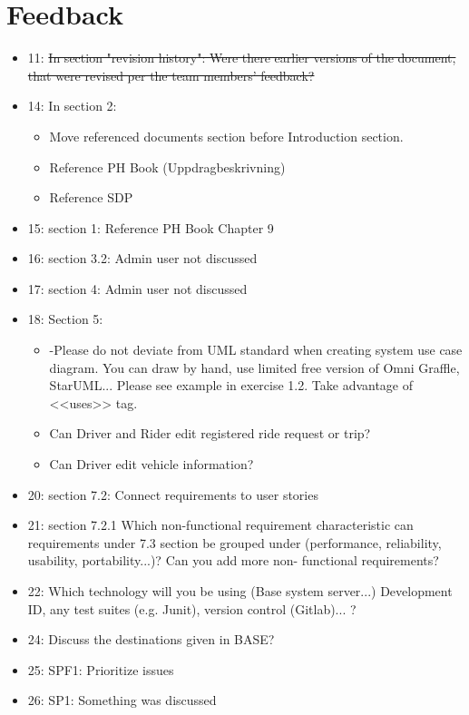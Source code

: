 \documentclass{article}
\begin{document}
\section{Feedback}
\begin{itemize}
    \item 11: \sout{In section "revision history": Were there earlier versions of the document, that were revised per the team members' feedback?}
    \item 14: In section 2:
    \begin{itemize}
        \item Move referenced documents section before Introduction section.
        \item Reference PH Book (Uppdragbeskrivning)
        \item Reference SDP
    \end{itemize}
    \item 15: section 1: Reference PH Book Chapter 9
    \item 16: section 3.2: Admin user not discussed
    \item 17: section 4: Admin user not discussed
    \item 18: Section 5:
    \begin{itemize}
        \item -Please do not deviate from UML standard when creating system use case diagram. You can draw by hand, use limited free version of Omni Graffle, StarUML... Please see example in exercise 1.2. Take advantage of <<uses>> tag.
        \item Can Driver and Rider edit registered ride request or trip?
        \item Can Driver edit vehicle information?
    \end{itemize}
    \item 20: section 7.2: Connect requirements to user stories
    \item 21: section 7.2.1 Which non-functional requirement characteristic can requirements under 7.3 section be grouped under (performance, reliability, usability, portability...)? Can you add more non- functional requirements?
    \item 22: Which technology will you be using (Base system server...) Development ID, any test suites (e.g. Junit), version control (Gitlab)... ?
    \item 24: Discuss the destinations given in BASE?
    \item 25: SPF1: Prioritize issues
    \item 26: SP1: Something was discussed
\end{itemize}
\end{document}
